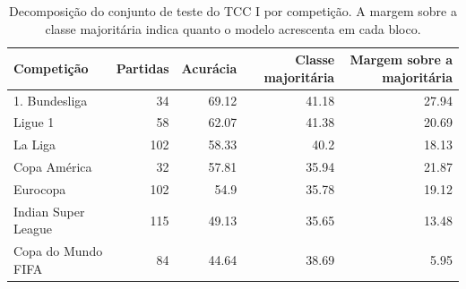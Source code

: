 \begin{table}[htbp]
\centering
\caption{Decomposição do conjunto de teste do TCC I por competição. A margem sobre a classe majoritária indica quanto o modelo acrescenta em cada bloco.}
\label{tab:efeito-composicao-decomp}
\small
\begin{tabular}{lrrrr}
\toprule
Competição & Partidas & Acurácia & Classe majoritária & Margem sobre a majoritária \\
\midrule
1. Bundesliga & 34 & 69.12 & 41.18 & 27.94 \\
Ligue 1 & 58 & 62.07 & 41.38 & 20.69 \\
La Liga & 102 & 58.33 & 40.2 & 18.13 \\
Copa América & 32 & 57.81 & 35.94 & 21.87 \\
Eurocopa & 102 & 54.9 & 35.78 & 19.12 \\
Indian Super League & 115 & 49.13 & 35.65 & 13.48 \\
Copa do Mundo FIFA & 84 & 44.64 & 38.69 & 5.95 \\
\bottomrule
\end{tabular}
\end{table}
